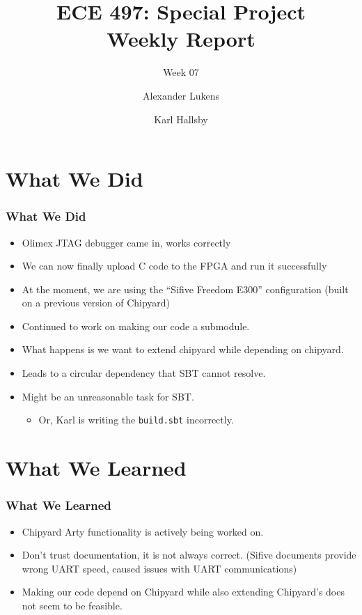 \documentclass{../weeklyslides}
\title[Weekly Report]{ECE 497: Special Project \\ Weekly Report}
\subtitle{Week 07}
\author{Alexander Lukens \and Karl Hallsby}
\institute{Illinois Institute of Technology}
\date{\DTMdisplaydate{2021}{3}{18}{-1}}
\begin{document}
\nocite{chipyard}

\begin{frame}
  \titlepage{}
\end{frame}

\section{What We Did}
\begin{frame}
  \frametitle{What We Did}
  \begin{itemize}
  \item Olimex JTAG debugger came in, works correctly
  \item We can now finally upload C code to the FPGA and run it successfully
  \item At the moment, we are using the ``Sifive Freedom E300'' configuration (built on a previous version of Chipyard)
  \end{itemize}
  \begin{itemize}
  \item Continued to work on making our code a submodule.
  \item What happens is we want to extend chipyard while depending on chipyard.
  \item Leads to a circular dependency that SBT cannot resolve.
  \item Might be an unreasonable task for SBT.\@
    \begin{itemize}
    \item Or, Karl is writing the \texttt{build.sbt} incorrectly.
    \end{itemize}
  \end{itemize}
\end{frame}

\section{What We Learned}\label{sec:What_We_Learned}
\begin{frame}
  \frametitle{What We Learned}
  \begin{itemize}
  \item Chipyard Arty functionality is actively being worked on.
  \item Don't trust documentation, it is not always correct. (Sifive documents provide wrong UART speed, caused issues with UART communications)
  \item Making our code depend on Chipyard while also extending Chipyard's does not seem to be feasible.
  \end{itemize}
\end{frame}
\end{document}
